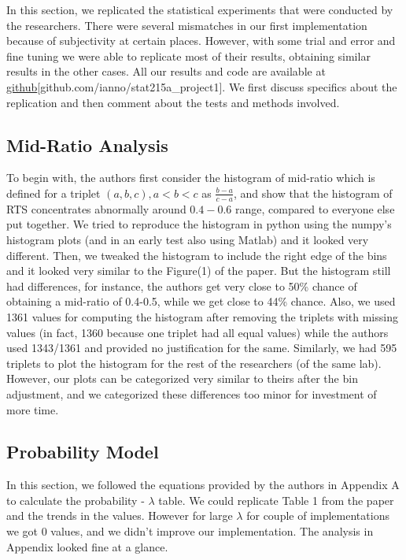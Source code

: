 \documentclass{article}
\begin{document}
In this section, we replicated the statistical experiments that were
conducted by the researchers. There were several mismatches in our first
implementation because of subjectivity at certain places. However, with
some trial and error and fine tuning we were able to replicate most of
their results, obtaining similar results in the other cases. All our
results and code are available at \hyperlink{https://github.com/ianno/stat215a_project1}{github}[github.com/ianno/stat215a\_project1]. We first discuss specifics about the replication and then comment about the tests and methods involved.


    \subsection{Mid-Ratio Analysis}\label{mid-ratio-analysis}

To begin with, the authors first consider the histogram of mid-ratio
which is defined for a triplet \((a, b, c), a<b<c\) as
\(\frac{b-a}{c-a}\), and show that the histogram of RTS concentrates
abnormally around \(0.4-0.6\) range, compared to everyone else put
together. We tried to reproduce the histogram in python using the
numpy's histogram plots (and in an early test also using Matlab) and it
looked very different. Then, we tweaked the histogram to include the
right edge of the bins and it looked very similar to the Figure(1) of
the paper. But the histogram still had differences, for instance, the
authors get very close to 50\% chance of obtaining a mid-ratio of
0.4-0.5, while we get close to 44\% chance. Also, we used 1361 values
for computing the histogram after removing the triplets with missing
values (in fact, 1360 because one triplet had all equal values) while
the authors used 1343/1361 and provided no justification for the same.
Similarly, we had 595 triplets to plot the histogram for the rest of the
researchers (of the same lab). However, our plots can be categorized
very similar to theirs after the bin adjustment, and we categorized
these differences too minor for investment of more time.

    \subsection{Probability Model}\label{probability-model}

In this section, we followed the equations provided by the authors in
Appendix A to calculate the probability - $\lambda$ table. We could
replicate Table 1 from the paper and the trends in the values. However for large $\lambda$ for couple of implementations we got $0$ values, and we didn't improve our implementation. The analysis in Appendix looked fine at a glance.
\end{document}

